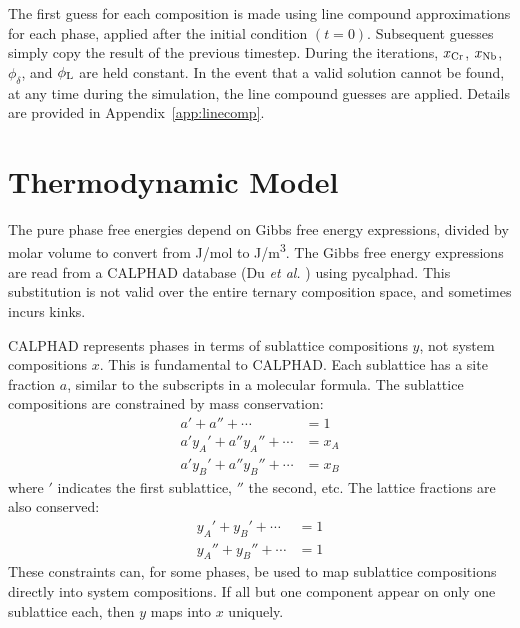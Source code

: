 \documentclass[10pt]{article}
\begin{document}
		The first guess for each composition is made using line compound approximations for each phase,
		applied after the initial condition $(t=0)$.
		Subsequent guesses simply copy the result of the previous timestep.
		During the iterations, $x_{\ce{Cr}}$,
		                       $x_{\ce{Nb}}$,
		                       $\phi_{\delta}$, and
		                       $\phi_{\ce{L}}$ are held constant.
		In the event that a valid solution cannot be found, at any time during the simulation,
		the line compound guesses are applied.
		Details are provided in Appendix~\ref{app:linecomp}.


	\section{Thermodynamic Model}
		The pure phase free energies depend on Gibbs free energy expressions, divided by molar volume to convert from \si{\joule/\mole} to \si{\joule/\cubic\meter}.
		The Gibbs free energy expressions are read from a CALPHAD database (Du \emph{et al.} \cite{Du2005}) using pycalphad.
		This substitution is not valid over the entire ternary composition space, and sometimes incurs kinks.

		CALPHAD represents phases in terms of sublattice compositions $y$, not system compositions $x$.
		This is fundamental to CALPHAD.
		Each sublattice has a site fraction $a$, similar to the subscripts in a molecular formula.
		The sublattice compositions are constrained by mass conservation:
		\begin{align}
			a' + a'' + \cdots &= 1\\\nonumber
			a'y_A' + a''y_A'' + \cdots &= x_A\\\label{eqn:sublattice}
			a'y_B' + a''y_B'' + \cdots &= x_B
		\end{align}
		where $'$ indicates the first sublattice, $''$ the second, etc.
		The lattice fractions are also conserved:
		\begin{align}\nonumber
			y_A' + y_B' + \cdots &= 1\\
			y_A'' + y_B'' + \cdots &= 1
		\end{align}
		These constraints can, for some phases, be used to map sublattice compositions directly into system compositions.
		If all but one component appear on only one sublattice each, then $y$ maps into $x$ uniquely.
\end{document}
